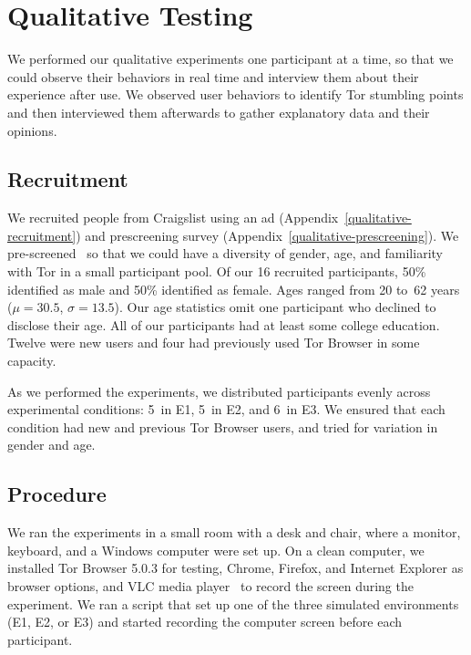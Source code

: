 \documentclass[USenglish,oneside,twocolumn]{article}
\begin{document}
\section{Qualitative Testing}
\label{sec:qualitative}
We performed our qualitative experiments one participant at a time, so that we could observe their behaviors in real time and interview them about their experience after use. We observed user behaviors to identify Tor stumbling points and then interviewed them afterwards to gather explanatory data and their opinions. 

\subsection{Recruitment}
We recruited people from Craigslist using an ad (Appendix~\ref{qualitative-recruitment}) and prescreening survey (Appendix~\ref{qualitative-prescreening}). We pre-screened~\cite{screening} so that we could have a diversity of gender, age, and familiarity with Tor in a small participant pool. Of our 16 recruited participants, 50\% identified as male and 50\% identified as female. Ages ranged from 20 to~62 years ($\mu = 30.5$, $\sigma = 13.5$). Our age statistics omit one participant who declined to disclose their age. All of our participants had at least some college education. Twelve were new users and four had previously used Tor Browser in some capacity.  



As we performed the experiments, we distributed participants evenly across experimental conditions:  5~in E1, 5~in E2, and 6~in E3. We ensured that each condition had new and previous Tor Browser users, and tried for variation in gender and age.

\subsection{Procedure} 
We ran the experiments in a small room with a desk and chair, where a monitor, keyboard, and a Windows computer were set up. On a clean computer, we installed Tor Browser 5.0.3 for testing, Chrome, Firefox, and Internet Explorer as browser options, and VLC media player~\cite{vlc} to record the screen during the experiment. We ran a script that set up one of the three simulated environments (E1, E2, or E3) and started recording the computer screen before each participant.
\end{document}
